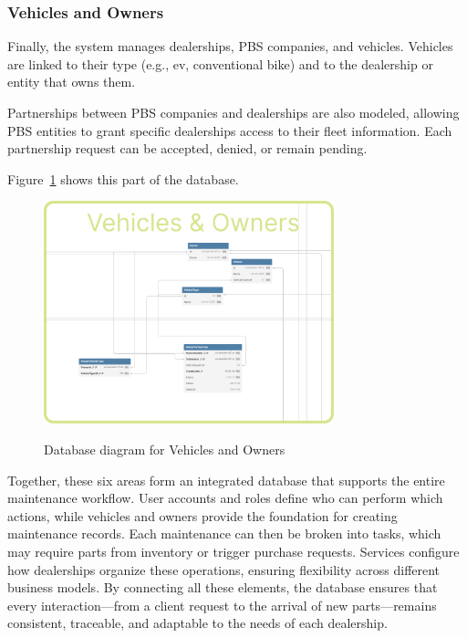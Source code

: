 \subsubsection{Vehicles and Owners} 


Finally, the system manages dealerships, \acs{PBS} companies, and vehicles. Vehicles are linked to their type (e.g., \ac{ev}, conventional bike) and to the dealership or entity that owns them.

Partnerships between \acs{PBS} companies and dealerships are also modeled, allowing \acs{PBS} entities to grant specific dealerships access to their fleet information. Each partnership request can be accepted, denied, or remain pending.

Figure~\ref{fig:dbVehicles} shows this part of the database.

\begin{figure}[h]
  \caption{Database diagram for Vehicles and Owners}
  \centering
  \includegraphics[width=0.75\textwidth]{figs/dbDiagrams/Vehicles_and_Owners}
  \label{fig:dbVehicles}
\end{figure}


Together, these six areas form an integrated database that supports the entire maintenance workflow. User accounts and roles define who can perform which actions, while vehicles and owners provide the foundation for creating maintenance records. Each maintenance can then be broken into tasks, which may require parts from inventory or trigger purchase requests. Services configure how dealerships organize these operations, ensuring flexibility across different business models. By connecting all these elements, the database ensures that every interaction—from a client request to the arrival of new parts—remains consistent, traceable, and adaptable to the needs of each dealership.

